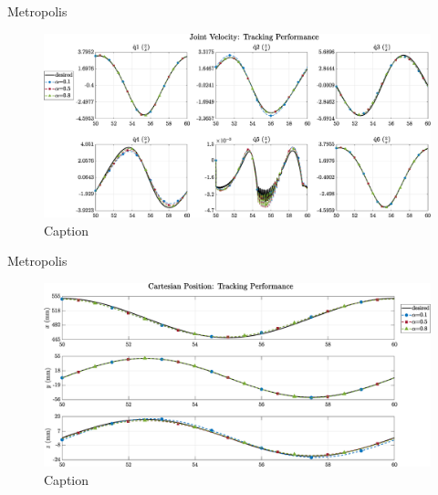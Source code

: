 \documentclass[10pt]{beamer}
\begin{document}
\begin{frame}[fragile]{Metropolis}

  \begin{figure}
      \centering
      \hspace*{-0.7cm}\includegraphics[width=1.1\linewidth]{img/articular_SMCi_velocity_compare.eps}
      \caption{Caption}
      \label{fig:my_label}
  \end{figure}

\end{frame}

\begin{frame}[fragile]{Metropolis}

  \begin{figure}
      \centering
      \hspace*{-0.7cm}\includegraphics[width=1.1\linewidth]{img/articular_SMCi_pos_xyz_compare.eps}
      \caption{Caption}
      \label{fig:my_label}
  \end{figure}

\end{frame}
\end{document}

